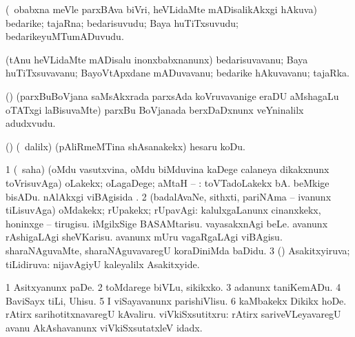 \bentry
{}
\gl{\nA}
\bmng
(\kanmu\ obabxna meVle parxBAva biVri, heVLidaMte mADisalikAkxgi hAkuva) bedarike; tajaRna; bedarisuvudu; Baya huTiTxsuvudu; bedarikeyuMTumADuvudu. 
\emng
\eentry

\bentry
{}
\gl{\nA}
\bmng
(tAnu heVLidaMte mADisalu inonxbabxnanunx) bedarisuvavanu; Baya huTiTxsuvavanu; BayoVtApxdane mADuvavanu; bedarike hAkuvavanu; tajaRka. 
\emng
\eentry

\bentry
{}
\gl{\nA}
\bmng
(\kerxY) (parxBuBoVjana saMsAkxrada parxsAda koVruvavanige eraDU aMshagaLu oTATxgi laBisuvaMte) parxBu BoVjanada berxDaDxnunx veYninalilx adudxvudu. 
\emng
\eentry

\bentry
{}
\gl{\sakirx}
\bmng
(\birx) (\sA\ \BUkaq dalilx) (pAliRmeMTina shAsanakekx) hesaru koDu. 
\emng
\eentry

\bentry
{}
\gl{\upa}
\expl{}
\bmng
\bnum
\num{1} (\rUpa\ saha) (oMdu vasutxvina, oMdu biMduvina kaDege calaneya dikakxnunx toVrisuvAga) oLakekx; oLagaDege; aMtaH -- :  toVTadoLakekx bA.  beMkige bisADu.    nAlAkxgi viBAgisida . 
\num{2} (badalAvaNe, sithxti, pariNAma -- ivanunx tiLisuvAga) oMdakekx; rUpakekx; rUpavAgi:  kalulxgaLanunx cinanxkekx, honinxge -- tirugisu.  iMgilxSige BASAMtarisu.  vayasakxnAgi beLe.  avanunx rAshigaLAgi sheVKarisu.  avanunx mUru vagaRgaLAgi viBAgisu.  sharaNAguvaMte, sharaNAguvavaregU koraDiniMda baDidu. 
\num{3} (\AmA) Asakitxyiruva; tiLidiruva:  nijavAgiyU kaleyalilx Asakitxyide. 
\enum
\emng

\noindent 
\gl{\nuga}
\bmng
\bnum
\num{1}  Asitxyanunx paDe. 
\num{2}  toMdarege biVLu, sikikxko. 
\num{3}  adanunx taniKemADu. 
\num{4}  BaviSayx tiLi, Uhisu. 
\num{5}  I viSayavanunx parishiVlisu. 
\num{6}  kaMbakekx Dikikx hoDe. 
  rAtirx sarihotitxnavaregU 
\banum
{} kAvaliru. 
 viVkiSxsutitxru:  rAtirx sariveVLeyavaregU avanu AkAshavanunx viVkiSxsutatxleV idadx. 
\eanum
\numie
\enum
\emng
\eentry

